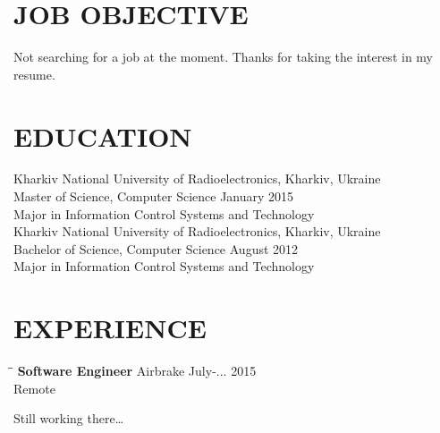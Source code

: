 \documentclass{res}
\begin{document}

\address{Kharkiv, Ukraine\\silin@kyrylo.org\\+380 98 909-30-34}

\begin{resume}

  \section{JOB OBJECTIVE}
  Not searching for a job at the moment. Thanks for taking the interest in my resume.

  \section{EDUCATION}
  Kharkiv National University of Radioelectronics, Kharkiv, Ukraine \\
  Master of Science, Computer Science \hfill January 2015 \\
  Major in Information Control Systems and Technology \\

  Kharkiv National University of Radioelectronics, Kharkiv, Ukraine \\
  Bachelor of Science, Computer Science \hfill August 2012 \\
  Major in Information Control Systems and Technology \\

  \section{EXPERIENCE}
  \vspace{-0.1in}

  \begin{tabbing}%
    \hspace{2.3in}\= \hspace{2.6in}\= \kill %
    {\bf Software Engineer}  \>Airbrake \> July-...  2015\\
    \>Remote
  \end{tabbing}\vspace{-20pt}
  Still working there\ldots


\end{resume}
\end{document}
